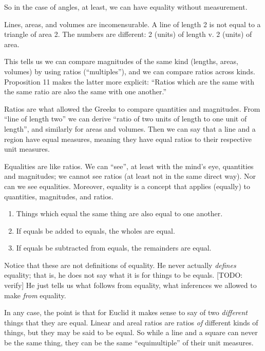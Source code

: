 \documentclass{article}
\begin{document}
So in the case of angles, at least, we can have equality without measurement.


Lines, areas, and volumes are incomensurable. A line of length 2 is
not equal to a triangle of area 2. The numbers are different: 2
(units) of length v. 2 (units) of area.


This tells us we can compare magnitudes of the same kind (lengths,
areas, volumes) by using ratios (``multiples''), and we can compare
ratios across kinds. Proposition 11 makes the latter more explicit:
\enquote{Ratios which are the same with the same ratio are also the
  same with one another.}

Ratios are what allowed the Greeks to compare quantities and
magnitudes. From ``line of length two'' we can derive ``ratio of two
units of length to one unit of length'', and similarly for areas and
volumes. Then we can say that a line and a region have equal measures,
meaning they have equal ratios to their respective unit measures.

Equalities are like ratios. We can ``see'', at least with the mind's
eye, quantities and magnitudes; we cannot see ratios (at least not in
the same direct way). Nor can we see equalities. Moreover, equality is
a concept that applies (equally) to quantities, magnitudes, and
ratios.

 \parencite{euclid}

\begin{enumerate}
\item Things which equal the same thing are also equal to one another.
\item If equals be added to equals, the wholes are equal.
\item If equals be subtracted from equals, the remainders are equal.
\end{enumerate}

Notice that these are not definitions of equality. He never actually
\textit{defines} equality; that is, he does not say what it is for
things to be equals. [TODO: verify] He just tells us what follows from
equality, what inferences we allowed to make \textit{from} equality.

In any case, the point is that for Euclid it makes sense to say of two
\textit{different} things that they are equal. Linear and areal ratios
are ratios \textit{of} different kinds of things, but they may be said
to be equal. So while a line and a square can never be the same thing,
they can be the same ``equimultiple'' of their unit measures.
\end{document}
